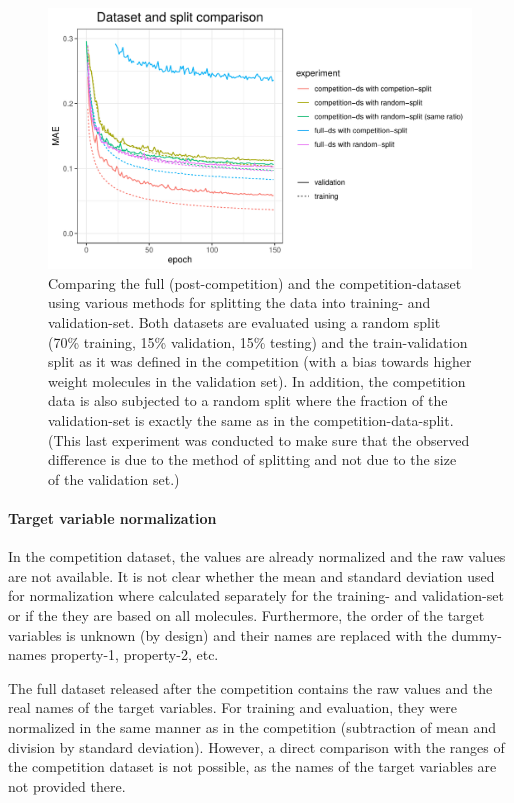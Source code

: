 \begin{figure}[H]
	\includegraphics[width=\linewidth]{figures/competition-vs-full-ds}
	\caption{Comparing the full (post-competition) and the competition-dataset using various methods for splitting the data into training- and validation-set. Both datasets are evaluated using a random split (70\% training, 15\% validation, 15\% testing) and the train-validation split as it was defined in the competition (with a bias towards higher weight molecules in the validation set). In addition, the competition data is also subjected to a random split where the fraction of the validation-set is exactly the same as in the competition-data-split. (This last experiment was conducted to make sure that the observed difference is due to the method of splitting and not due to the size of the validation set.)}
	\label{fig:competition-vs-full-ds}
\end{figure}


\paragraph*{Target variable normalization}

In the competition dataset, the values are already normalized and the raw values are not available. It is not clear whether the mean and standard deviation used for normalization where calculated separately for the training- and validation-set or if the they are based on all molecules. Furthermore, the order of the target variables is unknown (by design) and their names are replaced with the dummy-names property-1, property-2, etc.

The full dataset released after the competition contains the raw values and the real names of the target variables. For training and evaluation, they were normalized in the same manner as in the competition (subtraction of mean and division by standard deviation). However, a direct comparison with the ranges of the competition dataset is not possible, as the names of the target variables are not provided there. 

